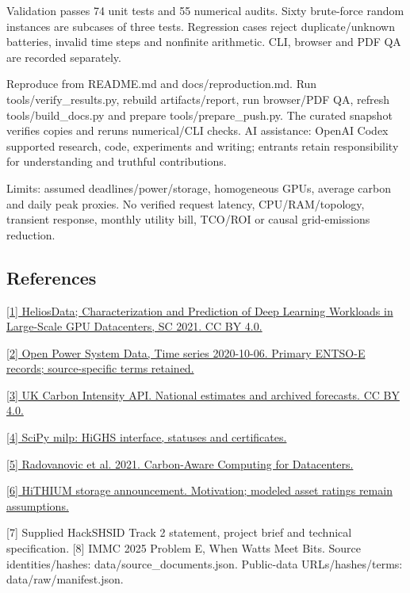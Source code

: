 \documentclass[10pt,a4paper]{article}
\begin{document}
Validation passes 74 unit tests and 55 numerical audits. Sixty brute-force random instances are subcases of three tests. Regression cases reject duplicate/unknown batteries, invalid time steps and nonfinite arithmetic. CLI, browser and PDF QA are recorded separately.

{\small Reproduce from README.md and docs/reproduction.md. Run tools/verify\_results.py, rebuild artifacts/report, run browser/PDF QA, refresh tools/build\_docs.py and prepare tools/prepare\_push.py. The curated snapshot verifies copies and reruns numerical/CLI checks. AI assistance: OpenAI Codex supported research, code, experiments and writing; entrants retain responsibility for understanding and truthful contributions.\par}

{\small Limits: assumed deadlines/power/storage, homogeneous GPUs, average carbon and daily peak proxies. No verified request latency, CPU/RAM/topology, transient response, monthly utility bill, TCO/ROI or causal grid-emissions reduction.\par}

\subsection*{References}

{\small \href{https://github.com/S-Lab-System-Group/HeliosData}{[1] HeliosData; Characterization and Prediction of Deep Learning Workloads in Large-Scale GPU Datacenters, SC 2021. CC BY 4.0.}\par}

{\small \href{https://doi.org/10.25832/time_series/2020-10-06}{[2] Open Power System Data, Time series 2020-10-06. Primary ENTSO-E records; source-specific terms retained.}\par}

{\small \href{https://carbonintensity.org.uk/}{[3] UK Carbon Intensity API. National estimates and archived forecasts. CC BY 4.0.}\par}

{\small \href{https://docs.scipy.org/doc/scipy/reference/generated/scipy.optimize.milp.html}{[4] SciPy milp: HiGHS interface, statuses and certificates.}\par}

{\small \href{https://arxiv.org/abs/2106.11750}{[5] Radovanovic et al. 2021. Carbon-Aware Computing for Datacenters.}\par}

{\small \href{https://www.hithium.com/newsroom/latest/details/86.html}{[6] HiTHIUM storage announcement. Motivation; modeled asset ratings remain assumptions.}\par}

{\small [7] Supplied HackSHSID Track 2 statement, project brief and technical specification. [8] IMMC 2025 Problem E, When Watts Meet Bits. Source identities/hashes: data/source\_documents.json. Public-data URLs/hashes/terms: data/raw/manifest.json.\par}
\end{document}
